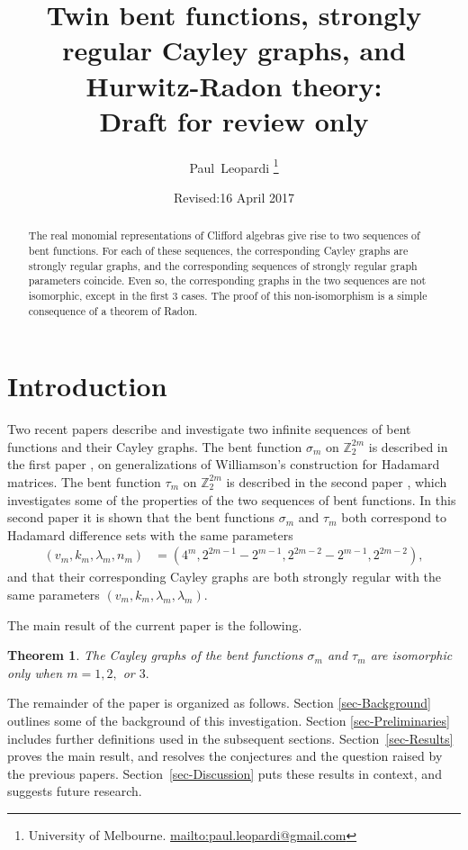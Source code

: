 \documentclass[12pt,a4paper]{article}
\title{Twin bent functions, strongly regular Cayley graphs, and Hurwitz-Radon theory:
\\
Draft for review only}
\author{
Paul~Leopardi
\thanks{University of Melbourne.
\protect\url{mailto:paul.leopardi@gmail.com}}
}
\date{Revised:16 April 2017}
\newcommand{\mb}[1]{\mathbb{#1}}
\newcommand{\Z}{\mb{Z}}
\newtheorem{Theorem}{Theorem}
\begin{document}
\maketitle

\begin{abstract}
%
The real monomial representations of Clifford algebras
give rise to two sequences of bent functions.
For each of these sequences, the corresponding Cayley graphs are
strongly regular graphs, and the corresponding sequences of strongly regular graph parameters coincide.
Even so, the corresponding graphs in the two sequences are not isomorphic, except in the first 3 cases.
The proof of this non-isomorphism is a simple consequence of a theorem of Radon.
%
\end{abstract}

\section{Introduction}
\label{sec-Introduction}
Two recent papers \cite{Leo14Constructions,Leo15Twin} describe and investigate two infinite sequences of bent functions and their Cayley graphs.
The bent function $\sigma_m$ on $\Z_2^{2 m}$ is described in the first paper \cite{Leo14Constructions}, on
generalizations of Williamson's construction for Hada\-mard matrices.
The bent function $\tau_m$ on $\Z_2^{2 m}$ is described in the second paper \cite{Leo15Twin},
which investigates some of the properties of the two sequences of bent functions.
In this second paper it is shown that the bent functions $\sigma_m$ and $\tau_m$ both correspond to Hada\-mard difference sets with the same parameters
\begin{align*}
(v_m,k_m,\lambda_m,n_m) &= (4^m, 2^{2 m - 1} - 2^{m-1}, 2^{2 m - 2} - 2^{m-1}, 2^{2 m - 2}),
\end{align*}
and that their corresponding Cayley graphs are both strongly regular with the same parameters $(v_m,k_m,\lambda_m,\lambda_m)$.

The main result of the current paper is the following.
\begin{Theorem}\label{HR-non-imomorphic-theorem}
The Cayley graphs of the bent functions $\sigma_m$ and $\tau_m$ are isomorphic only when $m=1, 2,$ or $3.$
\end{Theorem}

The remainder of the paper is organized as follows.
Section \ref{sec-Background} outlines some of the background of this investigation.
Section \ref{sec-Preliminaries} includes further definitions used in the subsequent sections.
Section~\ref{sec-Results} proves the main result, and resolves the conjectures and the question raised by the previous papers.
Section~\ref{sec-Discussion} puts these results in context, and suggests future research.
\end{document}
